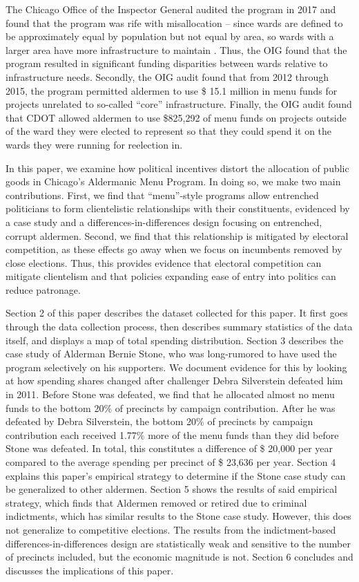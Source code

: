 The Chicago Office of the Inspector General audited the program in 2017 and found that the program was rife with misallocation -- since wards are defined to be approximately equal by population but not equal by area, so wards with a larger area have more infrastructure to maintain \cite{OIGaudit}.
Thus, the OIG found that the program resulted in significant funding disparities between wards relative to infrastructure needs.
Secondly, the OIG audit found that from 2012 through 2015, the program permitted aldermen to use \$ 15.1 million in menu funds for projects unrelated to so-called ``core'' infrastructure.
Finally, the OIG audit found that CDOT allowed aldermen to use \$825,292 of menu funds on projects outside of the ward they were elected to represent so that they could spend it on the wards they were running for reelection in.

In this paper, we examine how political incentives distort the allocation of public goods in Chicago's Aldermanic Menu Program.
In doing so, we make two main contributions.
First, we find that ``menu''-style programs allow entrenched politicians to form clientelistic relationships with their constituents, evidenced by a case study and a differences-in-differences design focusing on entrenched, corrupt aldermen.
Second, we find that this relationship is mitigated by electoral competition, as these effects go away when we focus on incumbents removed by close elections. 
Thus, this provides evidence that electoral competition can mitigate clientelism and that policies expanding ease of entry into politics can reduce patronage.

Section 2 of this paper describes the dataset collected for this paper. 
It first goes through the data collection process, then describes summary statistics of the data itself, and displays a map of total spending distribution.
Section 3 describes the case study of Alderman Bernie Stone, who was long-rumored to have used the program selectively on his supporters.
We document evidence for this by looking at how spending shares changed after challenger Debra Silverstein defeated him in 2011. 
Before Stone was defeated, we find that he allocated almost no menu funds to the bottom 20\% of precincts by campaign contribution. 
After he was defeated by Debra Silverstein, the bottom 20\% of precincts by campaign contribution each received 1.77\% more of the menu funds than they did before Stone was defeated.
In total, this constitutes a difference of \$ 20,000 per year compared to the average spending per precinct of \$ 23,636 per year. 
Section 4 explains this paper's empirical strategy to determine if the Stone case study can be generalized to other aldermen.
Section 5 shows the results of said empirical strategy, which finds that Aldermen removed or retired due to criminal indictments, which has similar results to the Stone case study. 
However, this does not generalize to competitive elections.
The results from the indictment-based differences-in-differences design are statistically weak and sensitive to the number of precincts included, but the economic magnitude is not. 
Section 6 concludes and discusses the implications of this paper.

